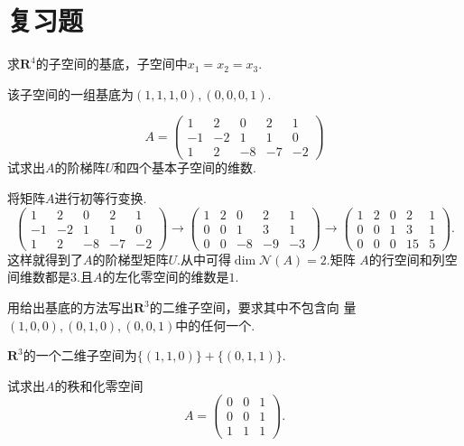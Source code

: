 ﻿\documentclass{book} \usepackage{exsheets} \usepackage{xeCJK}
\begin{document}
\section{复习题}
\begin{question}
  求$\mathbf{R}^4$的子空间的基底，子空间中$x_1=x_2=x_3$.
\end{question}
\begin{solution}
  该子空间的一组基底为$(1,1,1,0),(0,0,0,1)$.
\end{solution}
\begin{question}
  $$ 
  A=
  \begin{pmatrix}
    1&2&0&2&1\\
    -1&-2&1&1&0\\
    1&2&-8&-7&-2
  \end{pmatrix}
 $$
 试求出$A$的阶梯阵$U$和四个基本子空间的维数.
\end{question}
\begin{solution}
  将矩阵$A$进行初等行变换.
$$
\begin{pmatrix}
  1&2&0&2&1\\
  -1&-2&1&1&0\\
  1&2&-8&-7&-2
\end{pmatrix}\to
\begin{pmatrix}
  1&2&0&2&1\\
  0&0&1&3&1\\
  0&0&-8&-9&-3
\end{pmatrix}\to
\begin{pmatrix}
  1&2&0&2&1\\
  0&0&1&3&1\\
  0&0&0&15&5
\end{pmatrix}.
$$这样就得到了$A$的阶梯型矩阵$U$.从中可得$\dim \mathcal{N}(A)=2$.矩阵
$A$的行空间和列空间维数都是$3$.且$A$的左化零空间的维数是$1$.
\end{solution}
\begin{question}
  用给出基底的方法写出$\mathbf{R}^3$的二维子空间，要求其中不包含向
  量$(1,0,0),(0,1,0),(0,0,1)$中的任何一个.
\end{question}
\begin{solution}
  $\mathbf{R}^3$的一个二维子空间为$\{(1,1,0)\}+\{(0,1,1)\}$.
\end{solution}
\begin{question}
  试求出$A$的秩和化零空间
$$
A=
\begin{pmatrix}
  0&0&1\\
  0&0&1\\
  1&1&1
\end{pmatrix}.
$$
\end{question}
\end{document}

